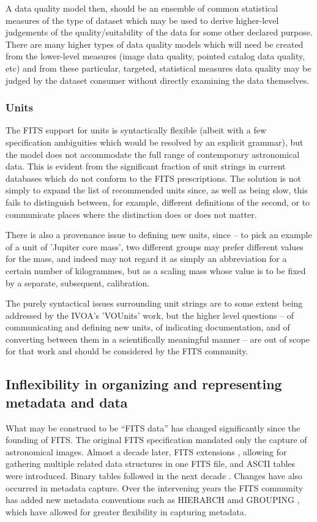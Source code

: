 \documentclass[final,authoryear,5p,times,twocolumn]{elsarticle}
\begin{document}
A data quality model then, should be an ensemble of common statistical
measures of the type of dataset which may be used to derive
higher-level judgements of the quality/suitability of the data for
some other declared purpose. There are many higher types of data
quality models which will need be created from the lower-level
measures (image data quality, pointed catalog data quality, etc) and
from these particular, targeted, statistical measures data quality may
be judged by the dataset consumer without directly examining the data
themselves.


\subsubsection{Units}


The FITS support for units is syntactically flexible (albeit with
a few specification ambiguities which would be resolved by an explicit
grammar), but the model does not accommodate the full range of
contemporary astronomical data.  This is evident from the significant
fraction of unit strings in current databases which do not conform to
the FITS prescriptions.  The solution is not simply to expand the list
of recommended units since, as well as being slow, this fails to
distinguish between, for example, different definitions of the second,
or to communicate places where the distinction does or does not
matter.

There is also a provenance issue to defining new units, since -- to
pick an example of a unit of 'Jupiter core mass', two different
groups may prefer different values for the mass, and indeed may not
regard it as simply an abbreviation for a certain number of
kilogrammes, but as a scaling mass whose value is to be fixed by a
separate, subsequent, calibration.

The purely syntactical issues surrounding unit strings are to some
extent being addressed by the IVOA's 'VOUnits' work, but the higher
level questions -- of communicating and defining new units, of
indicating documentation, and of converting between them in a
scientifically meaningful manner -- are out of scope for that work and
should be considered by the FITS community.


\subsection{Inflexibility in organizing and representing metadata and data}


What may be construed to be ``FITS data'' has changed significantly
since the founding of FITS. The original FITS specification mandated
only the capture of astronomical images. Almost a decade later, FITS
extensions \citep{1988A&AS...73..359G}, allowing for gathering
multiple related data structures in one FITS file, and ASCII tables
\citep{1988A&AS...73..365H} were introduced. Binary tables followed in
the next decade \citep{1995A&AS..113..159C}. Changes have also
occurred in metadata capture. Over the intervening years the FITS
community has added new metadata conventions such as HIERARCH
\citep{2009Wic} amd GROUPING \citep{2007Jen}, which have allowed for
greater flexibility in capturing metadata.
\end{document}
